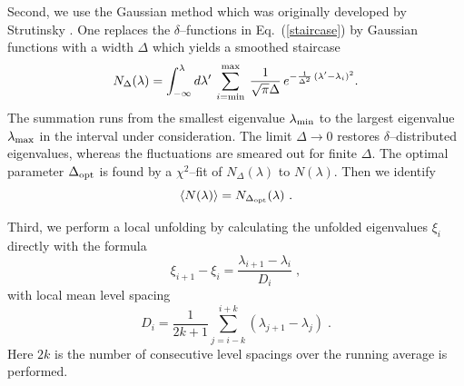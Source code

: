 Second, we use the Gaussian method which was originally developed by
Strutinsky \cite{haake}.  One replaces the $\delta$--functions in
Eq.~(\ref{staircase}) by Gaussian functions with a width $\Delta$
which yields a smoothed staircase
\begin{equation}
N_\Delta(\lambda)=\int_{-\infty}^\lambda d\lambda'\:
        \sum_{i={\rm min}}^{{\rm max}}\:\frac{1}{\sqrt{\pi}\Delta}\,
        e^{-\frac{1}{\Delta^2}\,(\lambda'-\lambda_i)^2} .
\label{gauss}
\end{equation}
The summation runs from the smallest eigenvalue $\lambda_{\rm min}$ to
the largest eigenvalue $\lambda_{\rm max}$ in the interval under
consideration.  The limit $\Delta\to0$ restores $\delta$--distributed
eigenvalues, whereas the fluctuations are smeared out for finite
$\Delta$.  The optimal parameter $\Delta_{\rm opt}$ is found by a
$\chi^2$--fit of $N_\Delta(\lambda)$ to $N(\lambda)$. Then we identify
\begin{equation}
\langle N(\lambda)\rangle=N_{\Delta_{\rm opt}}(\lambda) \ .
\label{Ngauss}
\end{equation}

Third, we perform a local unfolding by calculating the unfolded
eigenvalues $\xi_i$ directly with the formula
\begin{equation}
\xi_{i+1}-\xi_i=\frac{\lambda_{i+1}-\lambda_i}{D_i}\;,
\end{equation}
with local mean level spacing
\begin{equation}
D_i=\frac{1}{2k+1}\sum_{j=i-k}^{i+k}(\lambda_{j+1}-\lambda_j)\;.
\label{mls}
\end{equation}
Here $2k$ is the number of consecutive level spacings over the running
average is performed.

